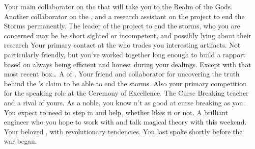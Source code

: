 \documentclass[char]{GL2020}
\begin{document}
\begin{contacts}
    \contact{\cFlowPriest{}} Your main collaborator on the \iBeansNB{} that will take you to the Realm of the Gods.
    \contact{\cAssistantScientist{}} Another collaborator on the \iBeansNB{}, and a research assistant on the \pTech{} project to end the Storms permanently.
    \contact{\cHeadScientist{}} The leader of the project to end the storms, who you are concerned may be be short sighted or incompetent, and possibly lying about their research
    \contact{\cChupSecond{}} Your primary contact at the \pSc{} who trades you interesting artifacts. Not particularly friendly, but you've worked together long enough to build a rapport based on \cChupSecond{\them} always being efficient and honest during your dealings. Except with that most recent box\ldots{}
    \contact{\cHedonist{}} A \cHedonist{\cleric} of \cFarmGod{}. Your friend and collaborator for uncovering the truth behind the \pTech{}'s claim to be able to end the storms. Also your primary competition for the speaking role at the Ceremony of Excellence.
    \contact{\cPrince{}} The Curse Breaking teacher and a rival of yours. As a noble, you know \cPrince{\theyare}n't as good at curse breaking as you. You expect to need to step in and help, whether \cPrince{} likes it or not.
    \contact{\cBunker{}} A brilliant engineer who you hope to work with and talk magical theory with this weekend.
    \contact{\cChupLeader{}} Your beloved \cChupLeader{\nibling}, with revolutionary tendencies. You last spoke shortly before the war began.
\end{contacts}
\end{document}
